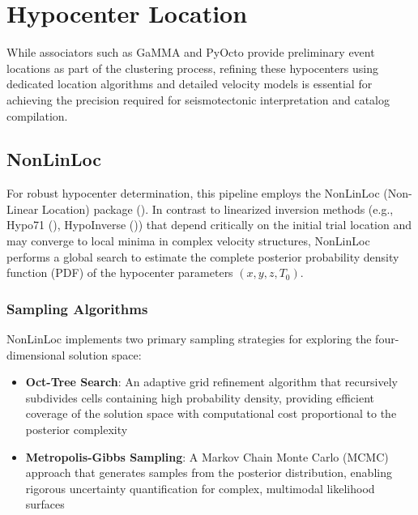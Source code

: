 \section{Hypocenter Location}

While associators such as GaMMA and PyOcto provide preliminary event locations
as part of the clustering process, refining these hypocenters using dedicated
location algorithms and detailed velocity models is essential for achieving the
precision required for seismotectonic interpretation and catalog compilation.

\subsection{NonLinLoc}

For robust hypocenter determination, this pipeline employs the NonLinLoc
(Non-Linear Location) package (\cite{NonLinLoc}). In contrast to linearized
inversion methods (e.g., Hypo71 (\cite{Hypo71}), HypoInverse
(\cite{HypoInverse})) that depend critically on the initial trial location and
may converge to local minima in complex velocity structures, NonLinLoc performs
a global search to estimate the complete posterior probability density function
(PDF) of the hypocenter parameters $(x, y, z, T_0)$.

\subsubsection{Sampling Algorithms}
NonLinLoc implements two primary sampling strategies for exploring the
four-dimensional solution space:
\begin{itemize}
  \item \textbf{Oct-Tree Search}: An adaptive grid refinement algorithm that
    recursively subdivides cells containing high probability density, providing
    efficient coverage of the solution space with computational cost
    proportional
    to the posterior complexity

  \item \textbf{Metropolis-Gibbs Sampling}: A Markov Chain Monte Carlo (MCMC)
    approach that generates samples from the posterior distribution, enabling
    rigorous uncertainty quantification for complex, multimodal likelihood
    surfaces
\end{itemize}

